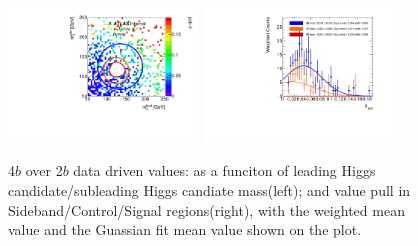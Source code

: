 \begin{figure}[htbp!]
\begin{center}
\includegraphics[width=0.45\textwidth,angle=-90]{figures/boosted/AppendixMuqcdstudy/FourTag_Incl_mH0H1.pdf}
\includegraphics[width=0.45\textwidth,angle=-90]{figures/boosted/AppendixMuqcdstudy/FourTag_Incl_mH0H1_pull.pdf}
\caption{4$b$ over 2$b$ data driven \muqcd values: \muqcd as a funciton of leading Higgs candidate/subleading Higgs candiate mass(left); and \muqcd value pull in Sideband/Control/Signal regions(right), with the weighted mean value and the Guassian fit mean value shown on the plot.}
\label{fig:app-muqcd-4b}
\end{center}
\end{figure}



